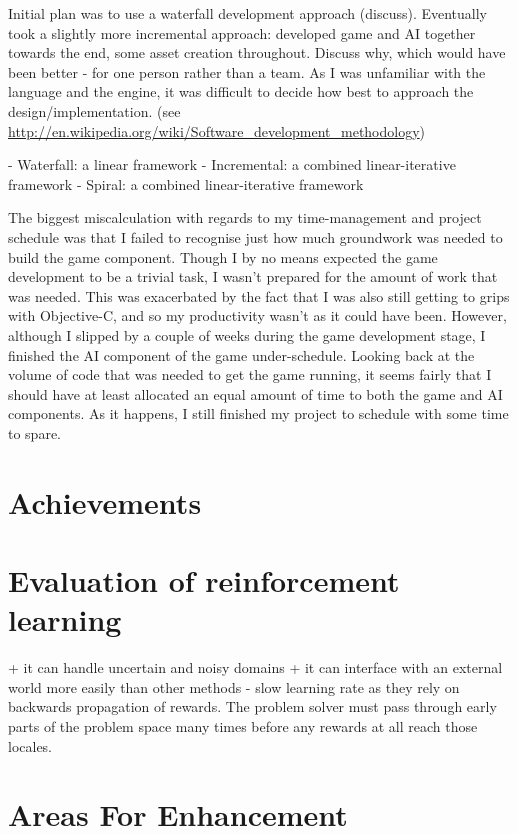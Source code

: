 \documentclass[a4paper,oneside]{report}
\begin{document}
Initial plan was to use a waterfall development approach (discuss). Eventually took a slightly more incremental approach: developed game and AI together towards the end, some asset creation throughout. Discuss why, which would have been better - for one person rather than a team. As I was unfamiliar with the language and the engine, it was difficult to decide how best to approach the design/implementation. (see \url{http://en.wikipedia.org/wiki/Software_development_methodology})
		
- Waterfall: a linear framework
- Incremental: a combined linear-iterative framework
- Spiral: a combined linear-iterative framework
		
The biggest miscalculation with regards to my time-management and project schedule was that I failed to recognise just how much groundwork was needed to build the game component. Though I by no means expected the game development to be a trivial task, I wasn't prepared for the amount of work that was needed. This was exacerbated by the fact that I was also still getting to grips with Objective-C, and so my productivity wasn't as it could have been. However, although I slipped by a couple of weeks during the game development stage, I finished the AI component of the game under-schedule. Looking back at the volume of code that was needed to get the game running, it seems fairly that I should have at least allocated an equal amount of time to both the game and AI components. As it happens, I still finished my project to schedule with some time to spare.

\section{Achievements}

\section{Evaluation of reinforcement learning}

+ it can handle uncertain and noisy domains
+ it can interface with an external world more easily than other methods
- slow learning rate as they rely on backwards propagation of rewards. The problem solver must pass through early parts of the problem space many times before any rewards at all reach those locales.


\section{Areas For Enhancement}
\end{document}
